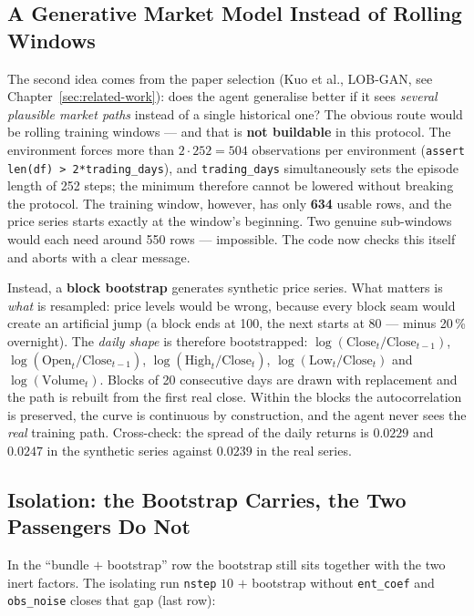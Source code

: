 \subsection{A Generative Market Model Instead of Rolling Windows}

The second idea comes from the paper selection (Kuo et al., LOB-GAN, see
Chapter~\ref{sec:related-work}): does the agent generalise better if it sees \emph{several
plausible market paths} instead of a single historical one? The obvious route would be
rolling training windows --- and that is \textbf{not buildable} in this protocol. The
environment forces more than $2 \cdot 252 = 504$ observations per environment
(\texttt{assert len(df) > 2*trading\_days}), and \texttt{trading\_days} simultaneously sets
the episode length of 252 steps; the minimum therefore cannot be lowered without breaking
the protocol. The training window, however, has only \textbf{634} usable rows, and the price
series starts exactly at the window's beginning. Two genuine sub-windows would each need
around 550 rows --- impossible. The code now checks this itself and aborts with a clear
message.

Instead, a \textbf{block bootstrap} generates synthetic price series. What matters is
\emph{what} is resampled: price levels would be wrong, because every block seam would create
an artificial jump (a block ends at 100, the next starts at 80 --- minus 20\,\% overnight).
The \emph{daily shape} is therefore bootstrapped:
$\log(\text{Close}_t/\text{Close}_{t-1})$, $\log(\text{Open}_t/\text{Close}_{t-1})$,
$\log(\text{High}_t/\text{Close}_t)$, $\log(\text{Low}_t/\text{Close}_t)$ and
$\log(\text{Volume}_t)$. Blocks of 20 consecutive days are drawn with replacement and the
path is rebuilt from the first real close. Within the blocks the autocorrelation is
preserved, the curve is continuous by construction, and the agent never sees the \emph{real}
training path. Cross-check: the spread of the daily returns is $0.0229$ and $0.0247$ in the
synthetic series against $0.0239$ in the real series.

\subsection{Isolation: the Bootstrap Carries, the Two Passengers Do Not}

In the ``bundle $+$ bootstrap'' row the bootstrap still sits together with the two inert
factors. The isolating run \texttt{nstep} $10$ $+$ bootstrap without \texttt{ent\_coef} and
\texttt{obs\_noise} closes that gap (last row):

